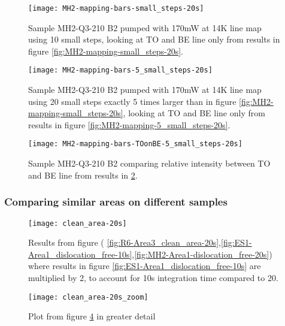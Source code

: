 
\begin{figure}[H]
\centering
\texttt{[image: MH2-mapping-bars-small\_steps-20s]}
\caption[MH2-Q3-210 line mapping]{Sample MH2-Q3-210 B2 pumped with 170mW at 14K line map using 10 small steps, looking at TO and BE line only from results in figure \ref{fig:MH2-mapping-small_steps-20s}.}
\label{fig:MH2-mapping-bars-small_steps-20s}%
\end{figure}

\begin{figure}[H]
\centering
\texttt{[image: MH2-mapping-bars-5\_small\_steps-20s]}
\caption[MH2-Q3-210 line mapping]{Sample MH2-Q3-210 B2 pumped with 170mW at 14K line map using 20 small steps exactly 5 times larger than in figure \ref{fig:MH2-mapping-small_steps-20s}, looking at TO and BE line only from results in figure \ref{fig:MH2-mapping-5_small_steps-20s}.}
\label{fig:MH2-mapping-bars-5_small_steps-20s}%
\end{figure}


\begin{figure}[H]
\centering
\texttt{[image: MH2-mapping-bars-TOonBE-5\_small\_steps-20s]}
\caption[MH2-Q3-210 line mapping]{Sample MH2-Q3-210 B2 comparing relative intensity between TO and BE line from results in \ref{fig:MH2-mapping-bars-5_small_steps-20s}.}
\label{fig:MH2-mapping-bars-TOonBE-5_small_steps-20s}%
\end{figure}


\subsubsection{Comparing similar areas on different samples}


\begin{figure}[H]
\centering
\texttt{[image: clean\_area-20s]}
\caption[Comparisons in a clean area]{Results from figure ( \ref{fig:R6-Area3_clean_area-20s},\ref{fig:ES1-Area1_dislocation_free-10s},\ref{fig:MH2-Area1-dislocation_free-20s}) where results in figure \ref{fig:ES1-Area1_dislocation_free-10s} are multiplied by 2, to account for 10s integration time compared to 20.}
\label{fig:clean_area-20s_comparison}%
\end{figure}

\begin{figure}[H]
\centering
\texttt{[image: clean\_area-20s\_zoom]}
\caption[Comparisons in a clean area]{Plot from figure \ref{fig:clean_area-20s_comparison} in greater detail}
\label{fig:clean_area-20s_zoom_comparison}%
\end{figure}

